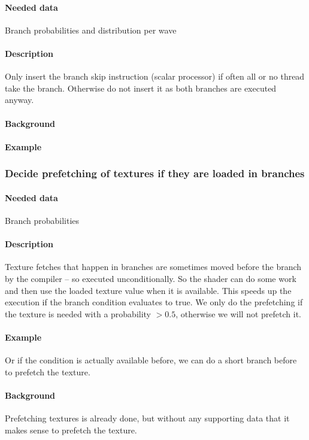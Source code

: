 \paragraph{Needed data} Branch probabilities and distribution per wave
\paragraph{Description} Only insert the branch skip instruction (scalar processor) if often all or no thread take the branch. Otherwise do not insert it as both branches are executed anyway.
\paragraph{Background}
\paragraph{Example}
	
\subsubsection{Decide prefetching of textures if they are loaded in branches}
\paragraph{Needed data} Branch probabilities
\paragraph{Description} Texture fetches that happen in branches are sometimes moved before the branch by the compiler -- so executed unconditionally. So the shader can do some work and then use the loaded texture value when it is available. This speeds up the execution if the branch condition evaluates to true. We only do the prefetching if the texture is needed with a probability $> 0.5$, otherwise we will not prefetch it.
\paragraph{Example}
	
Or if the condition is actually available before, we can do a short branch before to prefetch the texture.
\paragraph{Background} Prefetching textures is already done, but without any supporting data that it makes sense to prefetch the texture.

